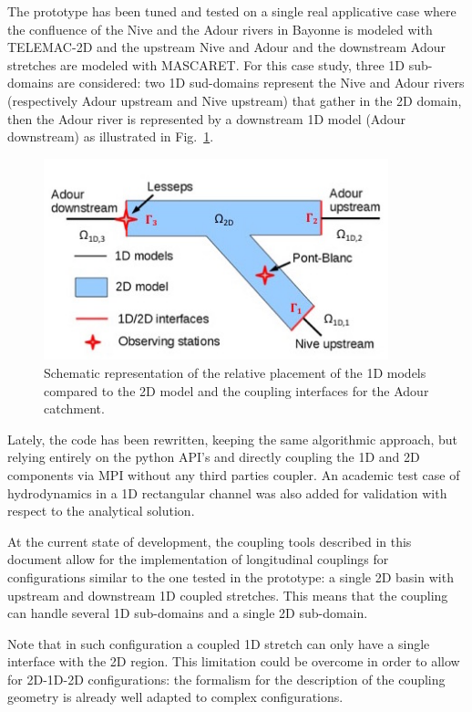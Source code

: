 The prototype has been tuned and tested on a single real applicative case
where the confluence of the Nive and the Adour rivers in Bayonne is
modeled with TELEMAC-2D and the upstream Nive and Adour and the
downstream Adour stretches are modeled with MASCARET. For this case
study, three 1D sub-domains are considered: two 1D sud-domains
represent the Nive and Adour rivers (respectively Adour upstream and
Nive upstream) that gather in the 2D domain, then the Adour river is
represented by a downstream 1D model (Adour downstream) as illustrated
in Fig.~\ref{fig:schema_coupling_2}.
\begin{figure}[htbp]
    \centering
        \centering \includegraphics[width=10cm]{graphics/schema_coupling_2.jpg}
    \caption{Schematic representation of the relative placement of the
      1D models compared to the 2D model and the coupling interfaces
      for the Adour catchment.}\label{fig:schema_coupling_2}
\end{figure}

Lately, the code has been rewritten, keeping the same algorithmic
approach, but relying entirely on the python API's and directly
coupling the 1D and 2D components via MPI without any third parties coupler.
An academic test case of hydrodynamics in a 1D rectangular channel was also added for validation with respect to the analytical solution.

At the current state of development, the coupling tools described in
this document allow for the implementation of longitudinal couplings
for configurations similar to the one tested in the prototype: a
single 2D basin with upstream and downstream 1D coupled
stretches. This means that the coupling can handle several 1D
sub-domains and a single 2D sub-domain.

Note that in such  configuration a coupled 1D stretch
can only have a single interface with the 2D region. This limitation
could be overcome in order to allow for 2D-1D-2D configurations:
the formalism for the description of the
coupling geometry is already well adapted to complex configurations.\newline

